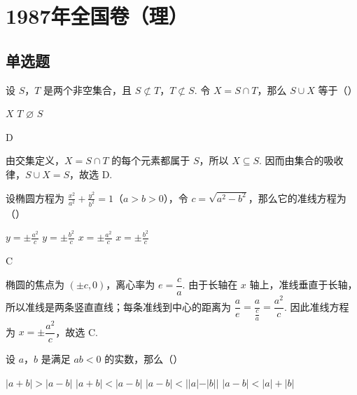 \chapter{1987年全国卷（理）}

\section{单选题}

\begin{problem}

设 \(S\)，\(T\) 是两个非空集合，且 \(S \not\subset T\)，\(T \not\subset S\). 令 \(X = S \cap T\)，那么 \(S \cup X\) 等于（\quad）

\choices
    {\(X\)}
    {\(T\)}
    {\(\varnothing\)}
    {\(S\)}
\end{problem}

\begin{answer}
D
\end{answer}

\begin{solution}
由交集定义，\(X=S\cap T\) 的每个元素都属于 \(S\)，所以 \(X\subseteq S\). 因而由集合的吸收律，\(S\cup X=S\)，故选 D.
\end{solution}

\begin{problem}

设椭圆方程为 \(\frac{x^2}{a^2} + \frac{y^2}{b^2} = 1\)（\(a > b > 0\)），令 \(c = \sqrt{a^2 - b^2}\)，那么它的准线方程为（\quad）

\choices
    {\(y = \pm \frac{a^2}{c}\)}
    {\(y = \pm \frac{b^2}{c}\)}
    {\(x = \pm \frac{a^2}{c}\)}
    {\(x = \pm \frac{b^2}{c}\)}
\end{problem}

\begin{answer}
C
\end{answer}

\begin{solution}
椭圆的焦点为 \(\left(\pm c,0\right)\)，离心率为 \(e=\dfrac{c}{a}\). 由于长轴在 \(x\) 轴上，准线垂直于长轴，所以准线是两条竖直直线；每条准线到中心的距离为
\(\dfrac{a}{e}=\dfrac{a}{\frac{c}{a}}=\dfrac{a^2}{c}\). 因此准线方程为 \(x=\pm\dfrac{a^2}{c}\)，故选 C.
\end{solution}

\begin{problem}

设 \(a\)，\(b\) 是满足 \(ab < 0\) 的实数，那么（\quad）

\choices
    {\(|a + b| > |a - b|\)}
    {\(|a + b| < |a - b|\)}
    {\(|a - b| < ||a| - |b||\)}
    {\(|a - b| < |a| + |b|\)}
\end{problem}

